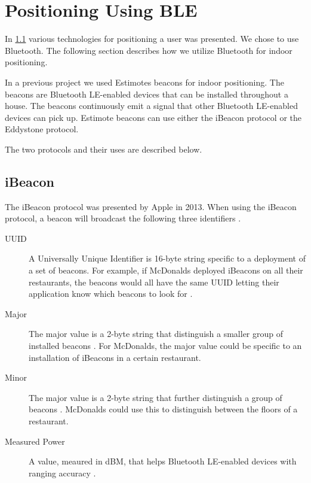 \section{Positioning Using BLE}
\label{sec:design:ble-positioning}

In \cref{} various technologies for positioning a user was presented. We chose to use Bluetooth. The following section describes how we utilize Bluetooth for indoor positioning.

In a previous project \cite{prespecialisation} we used Estimotes beacons for indoor positioning. The beacons are Bluetooth LE-enabled devices that can be installed throughout a house. The beacons continuously emit a signal that other Bluetooth LE-enabled devices can pick up.
Estimote beacons can use either the iBeacon protocol or the Eddystone protocol.

The two protocols and their uses are described below.

\subsection{iBeacon}

The iBeacon protocol was presented by Apple in 2013. When using the iBeacon protocol, a beacon will broadcast the following three identifiers \cite[ch. 1]{gilchrist2014learning}.

\begin{description}
\item[UUID] A Universally Unique Identifier is 16-byte string \cite{estimote:what-is-ibeacon} specific to a deployment of a set of beacons. For example, if McDonalds deployed iBeacons on all their restaurants, the beacons would all have the same UUID letting their application know which beacons to look for \cite[ch. 1]{gilchrist2014learning}.
\item[Major] The major value is a 2-byte string \cite{estimote:what-is-ibeacon} that distinguish a smaller group of installed beacons \cite[ch. 1]{gilchrist2014learning}. For McDonalds, the major value could be specific to an installation of iBeacons in a certain restaurant.
\item[Minor] The major value is a 2-byte string \cite{estimote:what-is-ibeacon} that further distinguish a group of beacons \cite[ch. 1]{gilchrist2014learning}. McDonalds could use this to distinguish between the floors of a restaurant.
\item[Measured Power] A value, meaured in dBM, that helps Bluetooth LE-enabled devices with ranging accuracy \cite{apple:proximity-beacon-spec}.
\end{description}

